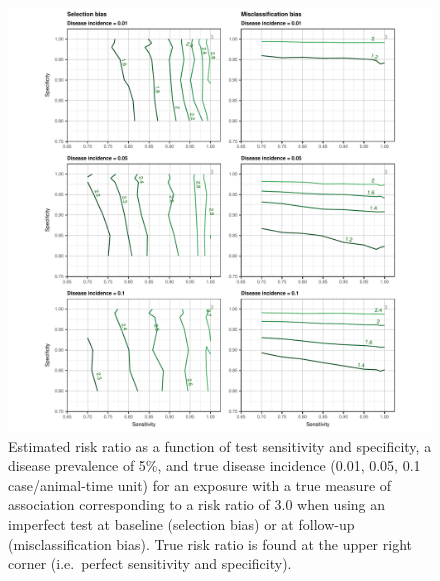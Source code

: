 \documentclass[utf8]{frontiers_suppmat} %
\begin{document}
\begin{figure}[htbp]
  \begin{center}
    \includegraphics[scale=.95]{master-risk5_contourX-1}
    \end{center}
  \caption{Estimated risk ratio as a function of test sensitivity and
    specificity, a disease prevalence of 5\%, and true disease incidence (0.01,
    0.05, 0.1 case/animal-time unit) for an exposure with a true measure of
    association corresponding to a risk ratio of \(3.0\) when using an imperfect
    test at baseline (selection bias) or at follow-up (misclassification bias).
    True risk ratio is found at the upper right corner (i.e.\ perfect
    sensitivity and specificity).}
  \label{fig:risk_contourX5}
\end{figure}
\end{document}
